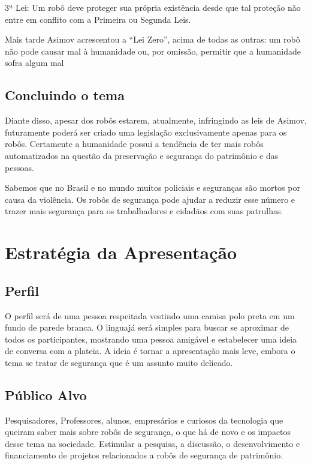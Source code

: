 \documentclass[12pt,a4paper]{article}
\begin{document}
    3ª Lei: Um robô deve proteger sua própria existência desde que tal proteção não entre em conflito com a Primeira ou Segunda Leis.

    Mais tarde Asimov acrescentou a “Lei Zero”, acima de todas as outras: um robô não pode causar mal à humanidade ou, por omissão, permitir que a humanidade sofra algum mal

    \subsection{Concluindo o tema}
    Diante disso, apesar dos robôs estarem, atualmente, infringindo as leis de Asimov, futuramente poderá ser criado uma legislação exclusivamente apenas para os robôs. Certamente a humanidade possui a tendência de ter mais robôs automatizados na questão da preservação e segurança do patrimônio e das pessoas.

    Sabemos que no Brasil e no mundo muitos policiais e seguranças são mortos por causa da violência. Os robôs de segurança pode ajudar a reduzir esse número e trazer mais segurança para os trabalhadores e cidadãos com suas patrulhas.  

    \section{Estratégia da Apresentação}

    \subsection{Perfil}
    O perfil será de uma pessoa respeitada vestindo uma camisa polo preta em um fundo de parede branca. O linguajá será simples para buscar se aproximar de todos os participantes, mostrando uma pessoa amigável e estabelecer uma ideia de conversa com a plateia. A ideia é tornar a apresentação mais leve, embora o tema se tratar de segurança que é um assunto muito delicado.

    \subsection{Público Alvo}
    Pesquisadores, Professores, alunos, empresários e curiosos da tecnologia que queiram saber mais sobre robôs de segurança, o que há de novo e os impactos desse tema na sociedade. Estimular a pesquisa, a discussão, o desenvolvimento e financiamento de projetos relacionados a robôs de segurança de patrimônio.
\end{document}
